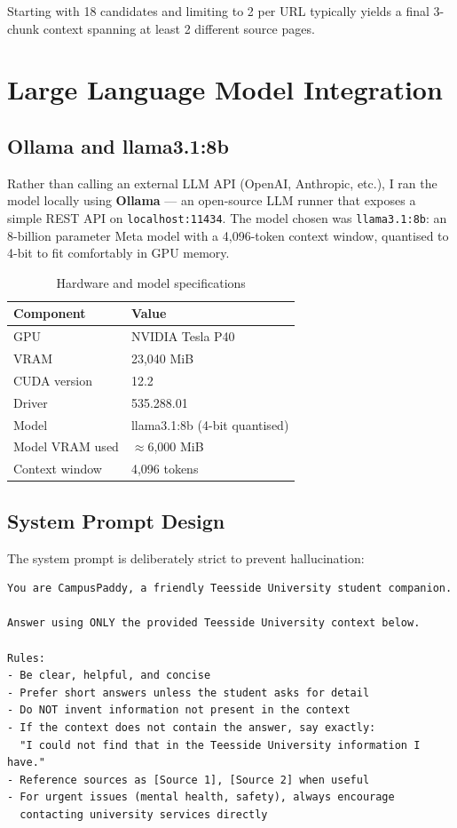\documentclass[12pt,a4paper]{report}
\begin{document}
Starting with 18 candidates and limiting to 2 per URL typically yields a final 3-chunk context spanning at least 2 different source pages.

\chapter{Large Language Model Integration}

\section{Ollama and llama3.1:8b}

Rather than calling an external LLM API (OpenAI, Anthropic, etc.), I ran the model locally using \textbf{Ollama} --- an open-source LLM runner that exposes a simple REST API on \texttt{localhost:11434}. The model chosen was \texttt{llama3.1:8b}: an 8-billion parameter Meta model with a 4,096-token context window, quantised to 4-bit to fit comfortably in GPU memory.

\begin{table}[H]
\centering
\caption{Hardware and model specifications}
\begin{tabular}{ll}
\toprule
\textbf{Component} & \textbf{Value} \\
\midrule
GPU             & NVIDIA Tesla P40 \\
VRAM            & 23,040 MiB \\
CUDA version    & 12.2 \\
Driver          & 535.288.01 \\
Model           & llama3.1:8b (4-bit quantised) \\
Model VRAM used & $\approx$6,000 MiB \\
Context window  & 4,096 tokens \\
\bottomrule
\end{tabular}
\end{table}

\section{System Prompt Design}

The system prompt is deliberately strict to prevent hallucination:

\begin{lstlisting}[caption=Ollama system prompt]
You are CampusPaddy, a friendly Teesside University student companion.

Answer using ONLY the provided Teesside University context below.

Rules:
- Be clear, helpful, and concise
- Prefer short answers unless the student asks for detail
- Do NOT invent information not present in the context
- If the context does not contain the answer, say exactly:
  "I could not find that in the Teesside University information I have."
- Reference sources as [Source 1], [Source 2] when useful
- For urgent issues (mental health, safety), always encourage
  contacting university services directly
\end{lstlisting}
\end{document}
